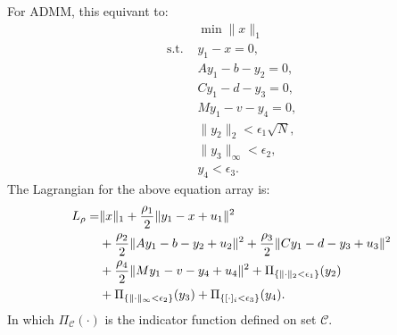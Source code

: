 \documentclass[annual]{acmsiggraph}
\begin{document}
For ADMM, this equivant to:
\begin{align}
&\min\|x\|_1\\
\mbox{s.t. }&y_1-x=0,\\
&Ay_1-b-y_2=0,\\
&Cy_1-d-y_3=0,\\
&My_1-v-y_4=0,\\
&\|y_2\|_2<\epsilon_1\sqrt{N},\\
&\|y_3\|_{\infty}<\epsilon_2,\\
&y_4<\epsilon_3.
\end{align}
The Lagrangian for the above equation array is:
\begin{align}
L_\rho=&\|x\|_1+\frac{\rho_1}{2}\|y_1-x+u_1\|^2\notag\\
&+\frac{\rho_2}{2}\|Ay_1-b-y_2+u_2\|^2+\frac{\rho_3}{2}\|Cy_1-d-y_3+u_3\|^2\notag\\
&+\frac{\rho_4}{2}\|My_1-v-y_4+u_4\|^2+\Pi_{\{\|\cdot\|_2<\epsilon_1\}}(y_2)\notag\\
&+\Pi_{\{\|\cdot\|_{\infty}<\epsilon_2\}}(y_3)+\Pi_{\{[\cdot]_i<\epsilon_3\}}(y_4).
\end{align}
In which $\Pi_{\mathcal{C}}(\cdot)$ is the indicator function defined on set $\mathcal{C}$.
\end{document}
